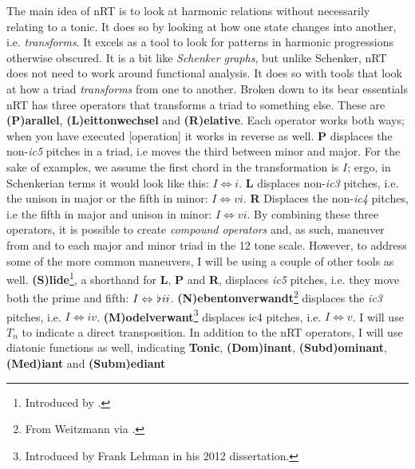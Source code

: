 The main idea of \ac{nRT} is to look at harmonic relations without necessarily relating to a tonic. It does so by looking at how one state changes into another, i.e. \textit{transforms}. It excels as a tool to look for patterns in harmonic progressions otherwise obscured. It is a bit like \textit{Schenker graphs}, but unlike Schenker, \ac{nRT} does not need to work around functional analysis. It does so with tools that look at how a triad \textit{transforms} from one to another. Broken down to its bear essentials \ac{nRT} has three operators that transforms a triad to something else. These are \textbf{(P)arallel}, \textbf{(L)eittonwechsel} and \textbf{(R)elative}. Each operator works both ways; when you have executed [operation] it works in reverse as well.
\textbf{P} displaces the non-\textit{ic5} pitches in a triad, i.e moves the third between minor and major. For the sake of examples, we assume the first chord in the transformation is \(I\); ergo, in Schenkerian terms it would look like this: \({I}\Leftrightarrow{i}\).
\textbf{L} displaces non-\textit{ic3} pitches, i.e. the unison in major or the fifth in minor: \({I}\Leftrightarrow{vi}\).
\textbf{R} Displaces the non-\textit{ic4} pitches, i.e the fifth in major and unison in minor: \({I}\Leftrightarrow{vi}\).
By combining these three operators, it is possible to create \textit{compound operators} and, as such, maneuver from and to each major and minor triad in the 12 tone scale. However, to address some of the more common maneuvers, I will be using a couple of other tools as well.
\textbf{(S)lide}\footnote{Introduced by \citealt{lewin_generalized_2007}.}, a shorthand for \textbf{L}, \textbf{P} and \textbf{R}, displaces \textit{ic5} pitches, i.e. they move both the prime and fifth: \({I}\Leftrightarrow{\hspace*{0.18ex}\flat\hspace*{0.18ex}}{ii}\).
\textbf{(N)ebentonverwandt}\footnote{From Weitzmann via \citealt{lehman_reading_2012}.} displaces the \textit{ic3} pitches, i.e. \({I}\Leftrightarrow{iv}\).
\textbf{(M)odelverwant}\footnote{Introduced by Frank Lehman in his 2012 dissertation.} displaces ic4 pitches, i.e. \({I}\Leftrightarrow{v}\). I will use \(T_{n}\) to indicate a direct transposition. In addition to the \ac{nRT} operators, I will use diatonic functions as well, indicating \textbf{Tonic}, \textbf{(Dom)inant}, \textbf{(Subd)ominant}, \textbf{(Med)iant} and \textbf{(Subm)ediant}

